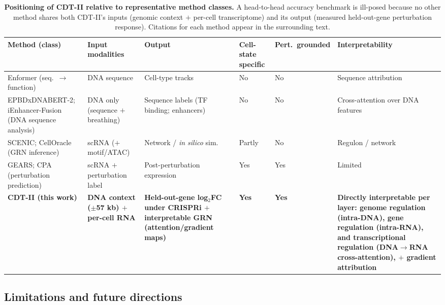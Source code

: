 \documentclass[12pt,a4paper]{article}
\begin{document}
\begin{table}[H]
\centering
\footnotesize
\caption{\textbf{Positioning of CDT-II relative to representative method classes.} A head-to-head accuracy benchmark is ill-posed because no other method shares both CDT-II's inputs (genomic context $+$ per-cell transcriptome) and its output (measured held-out-gene perturbation response). Citations for each method appear in the surrounding text.}
\label{tab:positioning}
\renewcommand{\arraystretch}{1.3}
\begin{tabular}{@{}p{2.8cm}p{2.5cm}p{2.4cm}p{1.5cm}p{1.5cm}p{2.6cm}@{}}
\toprule
Method (class) & Input modalities & Output & Cell-state specific & Pert.\ grounded & Interpretability \\
\midrule
Enformer (seq.\ $\rightarrow$ function) & DNA sequence & Cell-type tracks & No & No & Sequence attribution \\
\addlinespace[5pt]
EPBDx\-DNABERT-2; iEnhancer-Fusion (DNA sequence analysis) & DNA only (sequence $+$ breathing) & Sequence labels (TF binding; enhancers) & No & No & Cross-attention over DNA features \\
\addlinespace[5pt]
SCENIC; CellOracle (GRN inference) & scRNA ($+$ motif/ATAC) & Network / \textit{in silico} sim. & Partly & No & Regulon / network \\
\addlinespace[5pt]
GEARS; CPA (perturbation prediction) & scRNA $+$ perturbation label & Post-perturbation expression & Yes & Yes & Limited \\
\addlinespace[5pt]
\textbf{CDT-II (this work)} & \textbf{DNA context ($\pm$57 kb) $+$ per-cell RNA} & \textbf{Held-out-gene log$_2$FC under CRISPRi $+$ interpretable GRN (attention/gradient maps)} & \textbf{Yes} & \textbf{Yes} & \textbf{Directly interpretable per layer: genome regulation (intra-DNA), gene regulation (intra-RNA), and transcriptional regulation (DNA$\to$RNA cross-attention), $+$ gradient attribution} \\
\bottomrule
\end{tabular}
\end{table}

\subsection{Limitations and future directions}
\end{document}
